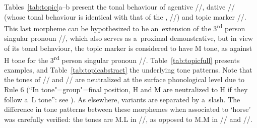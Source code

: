 Tables~\ref{tab:topic}a--b present the tonal behaviour of agentive //, dative
// (whose tonal behaviour is identical with that of the , //) and topic
marker //. This last morpheme can be hypothesized to be an~extension of the 3\textsuperscript{rd}
person singular pronoun //, which also serves as a~proximal demonstrative, but in view of its tonal behaviour, the topic marker is considered to have M tone, as against H tone for the 3\textsuperscript{rd}
person singular pronoun //. Table~\ref{tab:topicfull} presents examples, and 
Table~\ref{tab:topicabstract} the underlying tone patterns. Note that the tones of // and
// are neutralized at the
surface phonological level due to Rule 6 (“In tone"=group"=final position, H and M are neutralized to H if they follow a~L tone”: see ). As elsewhere, variants are separated by a~slash. The difference in tone patterns between these morphemes when associated to `horse' was carefully verified: the tones are M.L in //, as opposed to M.M in // and //.	

